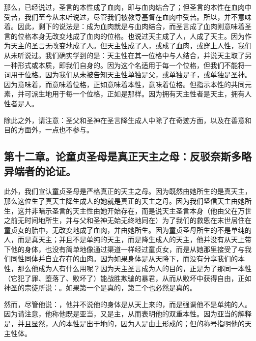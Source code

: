 那么，已经说过，圣言的本性成了血肉，即与血肉结合了；但圣言的本性在血肉中受苦，我们至今从未听说过，尽管我们被教导基督在血肉中受苦。所以，并不意味着。因此，剩下的说法是：成为血肉就是与血肉结合，而圣言成了血肉则意味着圣言的位格本身无改变地成了血肉的位格。也说过天主成了人，人成了天主。因为作为天主的圣言无改变地成了人。但天主性成了人，或成了血肉，或穿上人性，我们从未听说过。我们确实学到的是：天主性在其一位格中与人结合，并说天主取了另一种形式或本质，即我们自身的。因为这个名适用于每一个位格，但我们不能将一词用于位格。因为我们从未被告知天主性单独是父，或单独是子，或单独是圣神。因为意味着，而意味着位格，正如意味着本性，意味着位格。但指示本性的共同元素，并可派生地用于每一个位格，正如是那样。因为拥有天主性者是天主，拥有人性者是人。\par

除此之外，请注意：圣父和圣神在圣言降生成人中除了在奇迹方面，以及在善意和目的方面外，一点也不参与。\par


\subsection{第十二章。论童贞圣母是真正天主之母：反驳奈斯多略异端者的论证。}

此外，我们宣认童贞圣母是严格真正的天主之母。因为既然由她所生的是真天主，那么这位生了真天主降生成人的她就是真正的天主之母。因为我们坚信天主由她所生，这并非暗示圣言的天主性由她开始存在，而是说天主圣言本身（他由父在万世之前无时间地所生，并与父和圣神无始无终地同在）为了我们的救恩在末世居住在童贞女的胎中，无改变地成了血肉，并由她所生。因为童贞圣母所生的不是单纯的人，而是真天主；并且不是单纯的天主，而是降生成人的天主，他并没有从天上带下他的身体，也没有简单地像通过渠道一样经过童贞女，而是从她那里接受了与我们同性同体并自立存在的血肉。因为如果身体是从天降下，而没有分享我们的本性，那么他成为人有什么用呢？因为天主圣言成为人的目的，正是为了那同一本性（它犯了罪、堕落了、败坏了）能战胜欺骗的暴君，从而从败坏中获得自由，正如神圣的宗徒所说：。如果第一个是真的，第二个也必然是真的。\par

然而，尽管他说：，他并不说他的身体是从天上来的，而是强调他不是单纯的人。因为请注意，他称他既是亚当，又是主，从而表明他的双重本性。因为亚当的解释是，并且显然，人的本性是出于地的，因为人是由土形成的；但的称号指明他的天主性体。\par

